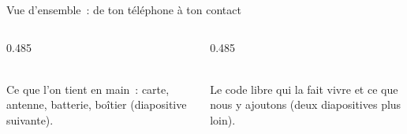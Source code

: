 \begin{frame}{Vue d'ensemble~: de ton téléphone à ton contact}
  \vspace{0.2cm}
  \begin{columns}[T]
    \begin{column}{0.485\textwidth}
      \begin{carte}[height=1.6cm,valign=top]
        \raggedright{}\\[1pt]
        {\footnotesize Ce que l'on tient en main~: carte, antenne, batterie, boîtier (diapositive suivante).}
      \end{carte}
    \end{column}
    \begin{column}{0.485\textwidth}
      \begin{carte}[height=1.6cm,valign=top]
        \raggedright{}\\[1pt]
        {\footnotesize Le code libre qui la fait vivre et ce que nous y ajoutons (deux diapositives plus loin).}
      \end{carte}
    \end{column}
  \end{columns}
\end{frame}

